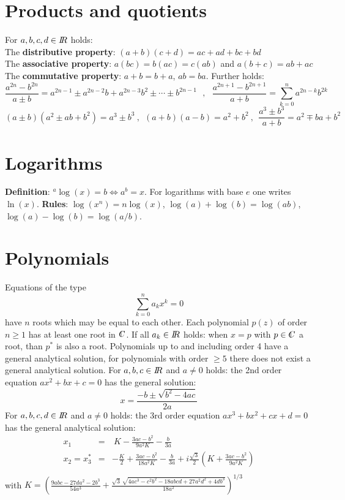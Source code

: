 \documentclass[a4paper,fancyheadings,twoside]{report}
\begin{document}
\section{Products and quotients}
For $a,b,c,d\in I\hspace{-1mm}R$ holds:\\
The {\bf distributive property}: $(a+b)(c+d)=ac+ad+bc+bd$\\
The {\bf associative property}: $a(bc)=b(ac)=c(ab)$ and $a(b+c)=ab+ac$\\
The {\bf commutative property}: $a+b=b+a$, $ab=ba$.
\npar
Further holds:
\[
\frac{a^{2n}-b^{2n}}{a\pm b}=a^{2n-1}\pm a^{2n-2}b+a^{2n-3}b^2\pm\cdots\pm b^{2n-1}~~~,~~~
\frac{a^{2n+1}-b^{2n+1}}{a+b}=\sum_{k=0}^n a^{2n-k}b^{2k}
\]
\[
(a\pm b)(a^2\pm ab+b^2)=a^3\pm b^3~,~~(a+b)(a-b)=a^2+b^2~,~~
\frac{a^3\pm b^3}{a+b}=a^2\mp ba+b^2
\]

\section{Logarithms}
{\bf Definition}: $^a\log(x)=b\Leftrightarrow a^b=x$. For logarithms with
base $e$ one writes $\ln(x)$.
\npar
{\bf Rules}: $\log(x^n)=n\log(x)$, $\log(a)+\log(b)=\log(ab)$, $\log(a)-\log(b)=\log(a/b)$.

\section{Polynomials}
Equations of the type
\[
\sum_{k=0}^n a_kx^k=0
\]
have $n$ roots which may be equal to each other. Each polynomial $p(z)$ of order
$n\geq1$ has at least one root in $\CC$. If all $a_k\in I\hspace{-1mm}R$ holds: when
$x=p$ with $p\in\CC$ a root, than $p^*$ is also a root. Polynomials up to and
including order 4 have a general analytical solution, for polynomials with
order $\geq5$ there does not exist a general analytical solution.
\npar
For $a,b,c\in I\hspace{-1mm}R$ and $a\neq0$ holds:
the 2nd order equation $ax^2+bx+c=0$ has the general solution:
\[
x=\frac{-b\pm\sqrt{b^2-4ac}}{2a}
\]
For $a,b,c,d\in I\hspace{-1mm}R$ and $a\neq0$ holds:
the 3rd order equation $ax^3+bx^2+cx+d=0$ has the general analytical solution:
\begin{eqnarray*}
x_1&=&~K-\frac{3ac-b^2}{9a^2K}-\frac{b}{3a}\\
x_2=x_3^*&=&-\frac{K}{2}+\frac{3ac-b^2}{18a^2K}-\frac{b}{3a}+i\frac{\sqrt{3}}{2}\left(K+\frac{3ac-b^2}{9a^2K}\right)\\
\end{eqnarray*}
with $\displaystyle K=\left(\frac{9abc-27da^2-2b^3}{54a^3}+
\frac{\sqrt{3}\,\sqrt{4ac^3-c^2b^2-18abcd+27a^2d^2+4db^3}}{18a^2}\right)^{1/3}$
\end{document}
